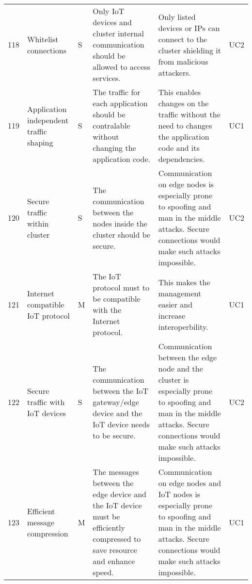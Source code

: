 \begin{longtable}{l p{2cm} p{0.8cm} p{3.6cm} p{4.5cm} p{0.8cm} }
118                     & Whitelist connections                   & S     & Only IoT devices and cluster internal communication should be allowed to access services.                                                                        & Only listed devices or IPs can connect to the cluster shielding it from malicious attackers.                                                                                      & UC2    \\
119                     & Application independent traffic shaping & S     & The traffic for each application should be contralable without changing the application code.                                                                    & This enables changes on the traffic without the need to changes the application code and its dependencies.                                                                        & UC1    \\
120                     & Secure traffic within cluster           & S     & The communication between the nodes inside the cluster should be secure.                                                                                         & Communication on edge nodes is especially prone to spoofing and man in the middle attacks. Secure connections would make such attacks impossible.                                 & UC2    \\
121                     & Internet compatible IoT protocol        & M     & The IoT protocol must to be compatible with the Internet protocol.                                                                                               & This makes the management easier and increase interoperbility.                                                                                                                    & UC1    \\
122                     & Secure traffic with IoT devices         & S     & The communication between the IoT gateway/edge device and the IoT device needs to be secure.                                                                     & Communication between the edge node and the cluster is especially prone to spoofing and man in the middle attacks. Secure connections would make such attacks impossible.         & UC2    \\
123                     & Efficient message compression           & M     & The messages between the edge device and the IoT device must be efficiently compressed to save resource and enhance speed.                                       & Communication on edge nodes and IoT nodes is especially prone to spoofing and man in the middle attacks. Secure connections would make such attacks impossible.                   & UC1    \\

\end{longtable}
